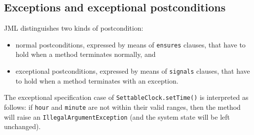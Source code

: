 \documentclass{llncs}
\begin{document}

\subsection{Exceptions and exceptional postconditions}
\label{Sec:Exceptions}

JML distinguishes two kinds of postcondition: 
\begin{itemize}
  \item normal postconditions, expressed
    by means of \texttt{ensures} clauses, that have to hold when a method
    terminates normally, and
    \item exceptional postconditions, expressed by means of \texttt{signals}
      clauses, that have to hold when a method terminates with an exception.
\end{itemize}
%
The exceptional specification case of \texttt{SettableClock.setTime()} is
interpreted as follows: if \texttt{hour} and \texttt{minute} are not within
their valid ranges, then the method will raise an \texttt{IllegalArgumentException} 
(and the system state will be left unchanged).
\end{document}
